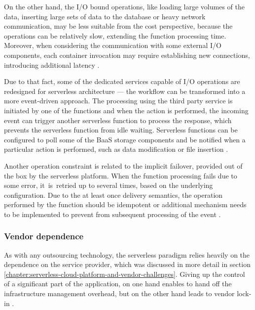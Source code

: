 On the other hand, the I/O bound operations, like loading large volumes of the data, inserting large sets of data to the database or heavy network communication, may be less suitable from the cost perspective, because the operations can be relatively slow, extending the function processing time. Moreover, when considering the communication with some external I/O components, each container invocation may require establishing new connections, introducing additional latency \cite{LeveragingServerlessCloudComputingArchitectures}.

Due to that fact, some of the dedicated services capable of I/O operations are redesigned for serverless architecture --- the workflow can be transformed into a more event-driven approach. The processing using the third party service is initiated by one of the functions and when the action is performed, the incoming event can trigger another serverless function to process the response, which prevents the serverless function from idle waiting. Serverless functions can be configured to poll some of the BaaS storage components and be notified when a particular action is performed, such as data modification or file insertion \cite{EvaluationOfServerlessApplicationProgrammingModel}.

Another operation constraint is related to the implicit failover, provided out of the box by the serverless platform. When the function processing fails due to some error, it~is~retried up to several times, based on the underlying configuration. Due to the at least once delivery semantics, the operation performed by the function should be idempotent or additional mechanism needs to be implemented to prevent from subsequent processing of the event \cite{EvaluationOfServerlessApplicationProgrammingModel}.

\subsubsection{Vendor dependence} \label{chapter:serverless-suitability-vendor-dependence}

As with any outsourcing technology, the serverless paradigm relies heavily on the dependence on the service provider, which was discussed in more detail in section \ref{chapter:serverless-cloud-platform-and-vendor-challenges}.
Giving up the control of a significant part of the application, on one hand enables to hand off the infrastructure management overhead, but on the other hand leads to vendor lock-in \cite{MartinFowlerServerless}.

